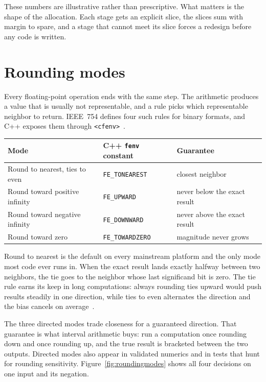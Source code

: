 \documentclass[manuscript, nonacm]{acmart}
\begin{document}
  These numbers are illustrative rather than prescriptive. What matters is
  the shape of the allocation. Each stage gets an explicit slice, the
  slices sum with margin to spare, and a stage that cannot meet its slice
  forces a redesign before any code is written.



  \section{Rounding modes}
  \label{sec:roundingmodes}

  Every floating-point operation ends with the same step. The arithmetic
  produces a value that is usually not representable, and a rule picks which
  representable neighbor to return. IEEE~754 defines four such rules for
  binary formats, and C++ exposes them through \texttt{<cfenv>}~\cite{ieee}.

  \begin{table}[tbp]
    \centering
    \begin{tabular}{lll}
      \toprule
      Mode                           & C++ \texttt{fenv} constant & Guarantee                    \\
      \midrule
      Round to nearest, ties to even & \texttt{FE\_TONEAREST}     & closest neighbor             \\
      Round toward positive infinity & \texttt{FE\_UPWARD}        & never below the exact result \\
      Round toward negative infinity & \texttt{FE\_DOWNWARD}      & never above the exact result \\
      Round toward zero              & \texttt{FE\_TOWARDZERO}    & magnitude never grows        \\
      \bottomrule
    \end{tabular}
  \end{table}

  Round to nearest is the default on every mainstream platform and the only
  mode most code ever runs in. When the exact result lands exactly halfway
  between two neighbors, the tie goes to the neighbor whose last
  significand bit is zero. The tie rule earns its keep in long
  computations: always rounding ties upward would push results steadily in
  one direction, while ties to even alternates the direction and the bias
  cancels on average~\cite{handbook}.

  The three directed modes trade closeness for a guaranteed direction. That
  guarantee is what interval arithmetic buys: run a computation
  once rounding down and once rounding up, and the true result is bracketed
  between the two outputs. Directed modes also appear in validated
  numerics and in tests that hunt for rounding sensitivity.
  Figure~\ref{fig:roundingmodes} shows all four decisions on one input and
  its negation.
\end{document}
